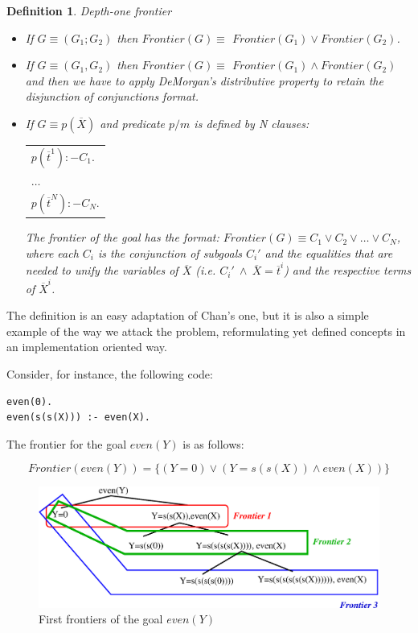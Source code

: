 \documentclass{tlp}
\newtheorem{definition}{Definition} %
\begin{document}
\begin{definition}{\em Depth-one frontier}

    \begin{itemize} 

\item If $G \equiv (G_1;G_2) $ then $Frontier(G) \equiv$
$Frontier(G_1) \vee Frontier(G_2)$.

\item If $G \equiv (G_1,G_2) $ then $Frontier(G) \equiv$
  $Frontier(G_1) \wedge Frontier(G_2)$ and then we have to apply
  DeMorgan's distributive property to retain the disjunction
  of conjunctions format.
  
\item If $G \equiv p( \overline{X}) $ and 
  predicate $p/m$ is defined by N clauses: 

\begin{center}
\begin{tabular}{l}
$p( \overline{t}^1):- C_1 .$ \\
$\ldots$ \\
$p( \overline{t}^N):- C_N .$ \\
\end{tabular}
\end{center}

The frontier of the goal has the format: $Frontier(G) \equiv C_1
\vee C_2 \vee \ldots \vee C_N$, where each $C_i$ is the
conjunction of subgoals $C_i'$ and the equalities that are needed to
unify the variables of $\overline{X}$ (i.e. $C_i'~\wedge~\overline{X}
= \overline{t}^i$) and the respective terms of
$\overline{X}^i$.

    \end{itemize}

\end{definition}

The definition is an easy adaptation of Chan's one, but it is also a
simple example of the way we attack the problem, reformulating yet
defined concepts in an implementation oriented way.
\medskip

\noindent
Consider, for instance, the following code:
{
\begin{verbatim}
even(0).
even(s(s(X))) :- even(X).
\end{verbatim}
}
The frontier for the goal $even (Y)$ is as follows:

\[Frontier(even(Y)) = \{ ( Y=0 ) \vee ( Y=s(s(X)) \wedge even(X) ) \} \] 

  \begin{figure}
        \centering
        \includegraphics[width=5in]{frontier.eps} 
        \caption{First frontiers of the goal $even(Y)$}
        \label{fig:frontier}
  \end{figure}
\end{document}
